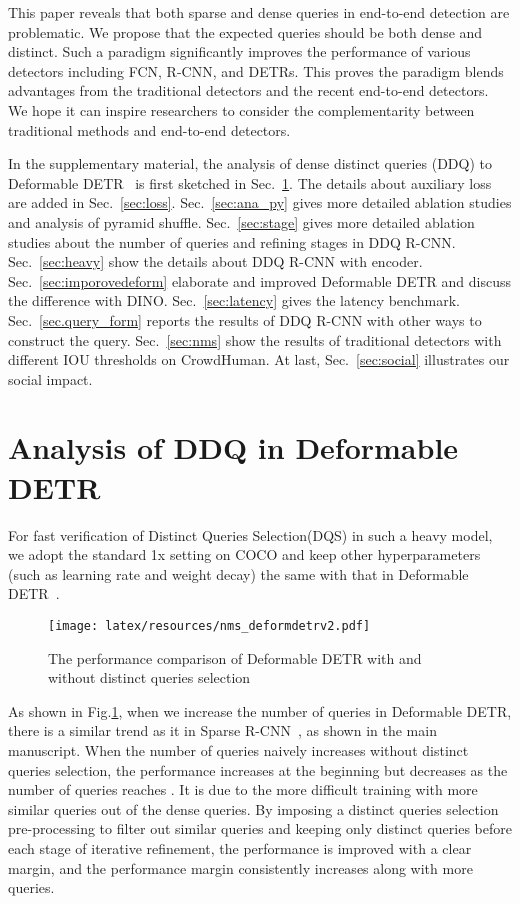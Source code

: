 \documentclass[10pt,twocolumn,letterpaper]{article}
\begin{document}
This paper reveals that both sparse and dense queries in end-to-end detection are problematic. We propose that the expected queries should be both dense and distinct. Such a paradigm significantly improves the performance
of various detectors including FCN, R-CNN, and DETRs. This proves the paradigm blends advantages from the traditional detectors and the recent end-to-end detectors. We hope it can inspire researchers to consider the complementarity between traditional methods and end-to-end detectors.

\clearpage
{\small


}

\clearpage
\appendix
In the supplementary material, the analysis of dense distinct queries (DDQ) to Deformable DETR~\cite{zhu2020deformable} is first sketched in Sec.~\ref{sec:deformable_detr}. The details about auxiliary loss are added in Sec.~\ref{sec:loss}.   Sec.~\ref{sec:ana_py} gives more detailed ablation studies and analysis of pyramid shuffle.  Sec.~\ref{sec:stage} gives more detailed ablation studies about the number of queries and refining stages in DDQ R-CNN.   Sec.~\ref{sec:heavy} show the details about DDQ R-CNN with encoder. Sec.~\ref{sec:imporovedeform} elaborate and improved Deformable DETR and discuss the difference with DINO. Sec.~\ref{sec:latency} gives the latency benchmark.
Sec.~\ref{sec.query_form} reports the results of DDQ R-CNN with other ways to construct the query. Sec.~\ref{sec:nms} show the results of traditional detectors with different IOU thresholds on CrowdHuman. At last, Sec.~\ref{sec:social} illustrates our social impact.

\section{Analysis of DDQ in Deformable DETR}
\label{sec:deformable_detr}
For fast verification of Distinct Queries Selection(DQS) in such a heavy model, we adopt the standard 1x setting on COCO and keep other hyperparameters (such as learning rate and weight decay) the same with that in Deformable DETR~\cite{zhu2020deformable}.
\begin{figure}[!h]
    \centering
    \texttt{[image: latex/resources/nms\_deformdetrv2.pdf]}
    \caption{The performance comparison of Deformable DETR with and without distinct queries selection}
    \label{fig:nms_deform_detr}
\end{figure}

As shown in  Fig.\ref{fig:nms_deform_detr},  when we increase the number of queries in Deformable DETR, there is a similar trend as it in Sparse R-CNN~\cite{sun2021sparse}, as shown in the main manuscript. When the number of queries naively increases without distinct queries selection, the performance increases at the beginning but decreases as the number of queries reaches . It is due to the more difficult training with more similar queries out of the dense queries. By imposing a distinct queries selection pre-processing to filter out similar queries and keeping only distinct queries before each stage of iterative refinement, the performance is improved with a clear margin, and the performance margin consistently increases along with more queries.
\end{document}

